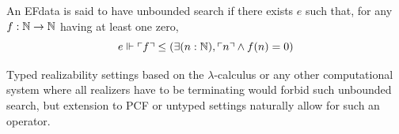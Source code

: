 \documentclass[a4paper,UKenglish,cleveref, autoref, thm-restate]{lipics-v2021}
\begin{document}


\begin{definition}
  An EFdata is said to have unbounded search if there exists $e$ such that, for any $f : \mathbb N \to \mathbb N$ having at least one zero,
  \[e \Vdash \ulcorner f\urcorner \leq (\exists (n : \mathbb N), \ulcorner n\urcorner \land f(n) = 0)\]
\end{definition}
\begin{example}
Typed realizability settings based on the $\lambda$-calculus or any other computational system where all realizers have to be
terminating would forbid such unbounded search,
but extension to PCF or untyped settings naturally allow for such an operator.
\end{example}
\end{document}
